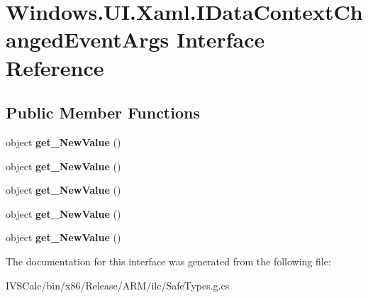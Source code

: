 \hypertarget{interface_windows_1_1_u_i_1_1_xaml_1_1_i_data_context_changed_event_args}{}\section{Windows.\+U\+I.\+Xaml.\+I\+Data\+Context\+Changed\+Event\+Args Interface Reference}
\label{interface_windows_1_1_u_i_1_1_xaml_1_1_i_data_context_changed_event_args}
\subsection*{Public Member Functions}
\begin{DoxyCompactItemize}
\item 
\mbox{\label{interface_windows_1_1_u_i_1_1_xaml_1_1_i_data_context_changed_event_args_a058656c552bfc69c96d5f6794f4bea95}} 
object {\bfseries get\+\_\+\+New\+Value} ()
\item 
\mbox{\label{interface_windows_1_1_u_i_1_1_xaml_1_1_i_data_context_changed_event_args_a058656c552bfc69c96d5f6794f4bea95}} 
object {\bfseries get\+\_\+\+New\+Value} ()
\item 
\mbox{\label{interface_windows_1_1_u_i_1_1_xaml_1_1_i_data_context_changed_event_args_a058656c552bfc69c96d5f6794f4bea95}} 
object {\bfseries get\+\_\+\+New\+Value} ()
\item 
\mbox{\label{interface_windows_1_1_u_i_1_1_xaml_1_1_i_data_context_changed_event_args_a058656c552bfc69c96d5f6794f4bea95}} 
object {\bfseries get\+\_\+\+New\+Value} ()
\item 
\mbox{\label{interface_windows_1_1_u_i_1_1_xaml_1_1_i_data_context_changed_event_args_a058656c552bfc69c96d5f6794f4bea95}} 
object {\bfseries get\+\_\+\+New\+Value} ()
\end{DoxyCompactItemize}


The documentation for this interface was generated from the following file\+:\begin{DoxyCompactItemize}
\item 
I\+V\+S\+Calc/bin/x86/\+Release/\+A\+R\+M/ilc/Safe\+Types.\+g.\+cs\end{DoxyCompactItemize}
